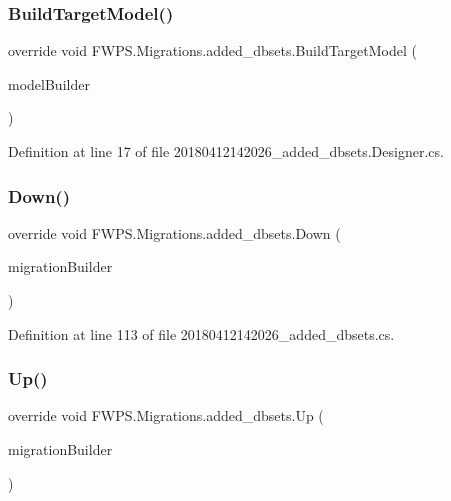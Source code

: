 \subsubsection{\texorpdfstring{Build\+Target\+Model()}{BuildTargetModel()}}
{\footnotesize\ttfamily override void F\+W\+P\+S.\+Migrations.\+added\+\_\+dbsets.\+Build\+Target\+Model (\begin{DoxyParamCaption}\item[{Model\+Builder}]{model\+Builder }\end{DoxyParamCaption})\hspace{0.3cm}{\ttfamily [protected]}}



Definition at line 17 of file 20180412142026\+\_\+added\+\_\+dbsets.\+Designer.\+cs.

\mbox{\label{class_f_w_p_s_1_1_migrations_1_1added__dbsets_a6c95648c6725a5dac262bfe807ad7a02}} 
\subsubsection{\texorpdfstring{Down()}{Down()}}
{\footnotesize\ttfamily override void F\+W\+P\+S.\+Migrations.\+added\+\_\+dbsets.\+Down (\begin{DoxyParamCaption}\item[{Migration\+Builder}]{migration\+Builder }\end{DoxyParamCaption})\hspace{0.3cm}{\ttfamily [protected]}}



Definition at line 113 of file 20180412142026\+\_\+added\+\_\+dbsets.\+cs.

\mbox{\label{class_f_w_p_s_1_1_migrations_1_1added__dbsets_a23337e6639d958dff4e8963ea7792266}} 
\subsubsection{\texorpdfstring{Up()}{Up()}}
{\footnotesize\ttfamily override void F\+W\+P\+S.\+Migrations.\+added\+\_\+dbsets.\+Up (\begin{DoxyParamCaption}\item[{Migration\+Builder}]{migration\+Builder }\end{DoxyParamCaption})\hspace{0.3cm}{\ttfamily [protected]}}



